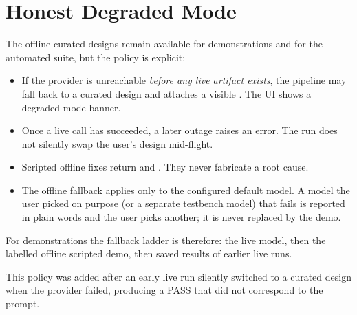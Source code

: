 \section{Honest Degraded Mode}
\label{sec:fallback}
The offline curated designs remain available for demonstrations and for the
automated suite, but the policy is explicit:

\begin{itemize}
\item If the provider is unreachable \emph{before any live artifact exists}, the
pipeline may fall back to a curated design and attaches a visible
. The UI shows a degraded-mode banner.
\item Once a live call has succeeded, a later outage raises an error. The run does
not silently swap the user's design mid-flight.
\item Scripted offline fixes return  and
. They never fabricate a root cause.
\item The offline fallback applies only to the configured default model. A model the
user picked on purpose (or a separate testbench model) that fails is reported in
plain words and the user picks another; it is never replaced by the demo.
\end{itemize}

For demonstrations the fallback ladder is therefore: the live model, then the
labelled offline scripted demo, then saved results of earlier live runs.

This policy was added after an early live run silently switched to a curated design
when the provider failed, producing a PASS that did not correspond to the prompt.

